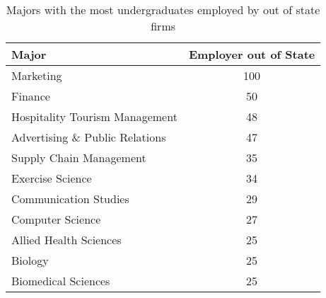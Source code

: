 \documentclass{article}
\begin{document}
\begin{table}[ht]
\centering
\begin{tabular}{lc}
  \hline
  Major & Employer out of State \\ 
  \hline
  Marketing & 100 \\ 
  Finance & 50 \\ 
  Hospitality Tourism Management & 48 \\ 
  Advertising \& Public Relations & 47 \\ 
  Supply Chain Management & 35 \\ 
  Exercise Science & 34 \\ 
  Communication Studies & 29 \\ 
  Computer Science & 27 \\ 
  Allied Health Sciences & 25 \\ 
  Biology & 25 \\ 
  Biomedical Sciences & 25 \\ 
   \hline
\end{tabular}
\caption*{Majors with the most undergraduates employed by out of state firms} 
\end{table}
\end{document}
